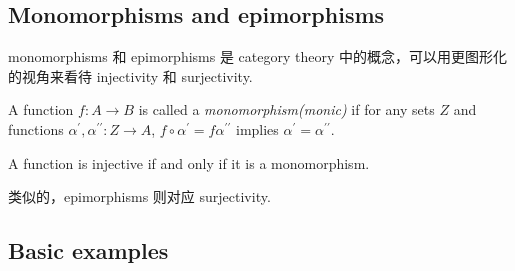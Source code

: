 \subsection{Monomorphisms and epimorphisms}\label{sec:1.2.6}

monomorphisms 和 epimorphisms 是 category theory 中的概念，可以用更图形化的视角来看待 injectivity 和 surjectivity.

A function $f: A \to B$ is called a \emph{monomorphism(monic)} if for any sets $Z$ and functions $\alpha^{\prime}, \alpha^{\prime\prime}: Z \to A$, $f \circ \alpha^{\prime} = f \alpha^{\prime\prime}$ implies $\alpha^{\prime}= \alpha^{\prime\prime}$.

\begin{proposition}
    A function is injective if and only if it is a monomorphism.
\end{proposition}

类似的，epimorphisms 则对应 surjectivity.

\subsection{Basic examples}\label{sec:1.2.7}


